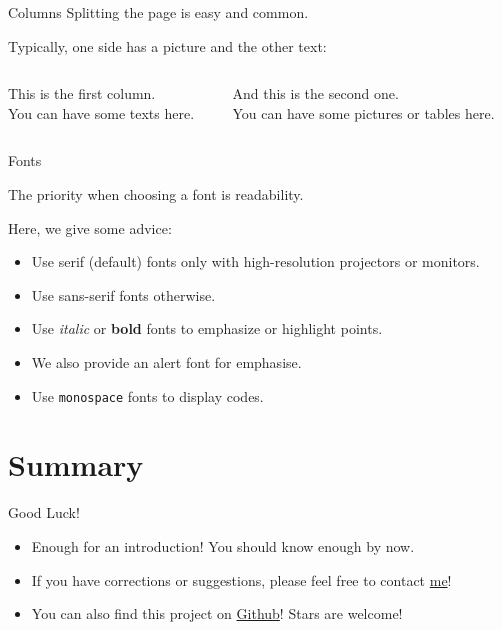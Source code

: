 \documentclass[10pt,aspectratio=169]{beamer}
\begin{document}
\begin{frame}{Columns}
	Splitting the page is easy and common.

	Typically, one side has a picture and the other text:
	
	\vspace{20pt}
	
	\begin{columns}
		\begin{column}{0.6\textwidth}
			This is the first column.\\[10pt]
			You can have some texts here.
		\end{column}
		
		\begin{column}{0.3\textwidth}
			And this is the second one.\\[10pt]
			You can have some pictures or tables here.
		\end{column}
	\end{columns}

\end{frame}

\begin{frame}{Fonts}
	
	The priority when choosing a font is readability.
	
	Here, we give some advice:
	\begin{itemize}
		\item Use serif (default) fonts only with high-resolution projectors or monitors.
		\item Use \textsf{sans-serif} fonts otherwise.
		\item Use \textit{italic} or \textbf{bold} fonts to emphasize or highlight points.
		\item We also provide an \alert{alert} font for emphasise.
		\item Use \texttt{monospace} fonts to display codes.
	\end{itemize}

\end{frame}

\section{Summary}

\begin{frame}{Good Luck!}
	\begin{itemize}
		\item Enough for an introduction! You should know enough by now.
		\item If you have corrections or suggestions, please feel free to contact \href{mailto:shiyi.liu@connect.ust.hk}{me}!
        \item You can also find this project on \href{https://github.com/andy-shiyi-liu/HKUST-Beamer-Template}{Github}! Stars are welcome!
	\end{itemize}
\end{frame}

\backmatter %
\end{document}
